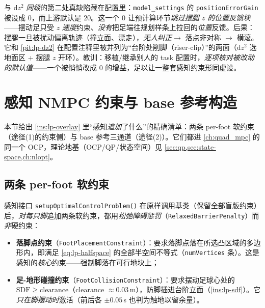 \begin{pitfall}[摆腿 $z$ 位置反馈被关断：\texttt{positionErrorGain=0}]\label{pit:lp-posgain}
与 $\mathrm{d}z^2$ \emph{同级}的第二处真缺陷藏在配置里：\texttt{model\_settings} 的 \texttt{positionErrorGain} 被设成 $0$，而上游默认是 $20$。这一个 $0$ 让预计算环节\emph{跳过摆腿 $z$ 的位置反馈块}——摆动足只受 $z$ \emph{速度}约束、\emph{没有}把足端往规划样条上拉回的\emph{位置}反馈。后果：摆腿一旦被扰动偏离轨迹（撞立面、漂走），\emph{无人纠正}$\to$ 落点非对称 $\to$ 横滚。它和 \cref{pit:lp-dz2} 在配置注释里被并列为“台阶处削脚（riser-clip）”的两面（$\mathrm{d}z^2$ 选地面区 + 摆腿 $z$ 开环）。教训：移植/继承别人的 task 配置时，\emph{逐项核对被改动的默认值}——一个被悄悄改成 $0$ 的增益，足以让一整套感知约束形同虚设。
\end{pitfall}

\section{感知 NMPC 约束与 base 参考构造}
\label{sec:lp-constraint}

本节给出 \cref{ins:lp-overlay} 里“感知\emph{追加}了什么”的精确清单：两条 per-foot 软约束（途径(1)的约束侧）与 base 参考三通道（途径(2)）。它们都进 \cref{ch:quad_mpc} 的同一个 OCP，理论地基（OCP/QP/状态空间）见 \cref{sec:qp,sec:state-space,ch:nlopt}。

\subsection{两条 per-foot 软约束}
\label{subsec:lp-soft}

感知接口 \texttt{setupOptimalControlProblem()} 在原样调用基类（保留全部盲版约束）后，\emph{对每只脚}追加两条软约束，都用\emph{松弛障碍惩罚}（\texttt{RelaxedBarrierPenalty}）而\emph{非}硬约束：

\begin{itemize}
  \item \textbf{落脚点约束}（\texttt{FootPlacementConstraint}）：要求落脚点落在所选凸区域的多边形内，即满足 \cref{eq:lp-halfspace} 的全部半空间不等式（\texttt{numVertices} 条）。这是感知的\emph{核心}约束——强制脚落在可行地块上；
  \item \textbf{足-地形碰撞约束}（\texttt{FootCollisionConstraint}）：要求摆动足球心处的 $\mathrm{SDF}\ge \text{clearance}$（clearance $\approx 0.03\,$m），防脚插进台阶立面（\cref{ins:lp-sdf}）。它\emph{只在脚摆动时}激活（前后各 $\pm 0.05\,$s 也判为触地以留余量）。
\end{itemize}

